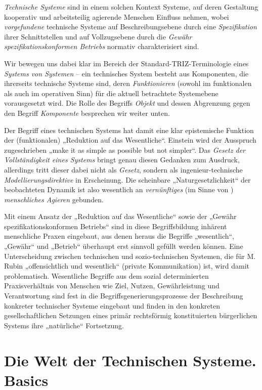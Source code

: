 \documentclass[11pt,a4paper]{article}
\begin{document}
\emph{Technische Systeme} sind in einem solchen Kontext Systeme, auf deren
Gestaltung kooperativ und arbeitsteilig agierende Menschen Einfluss nehmen,
wobei \emph{vorgefundene} technische Systeme auf Beschreibungsebene durch eine
\emph{Spezifikation} ihrer Schnittstellen und auf Vollzugsebene durch die
\emph{Gewähr spezifikationskonformen Betriebs} normativ charakterisiert sind.

Wir bewegen uns dabei klar im Bereich der Standard-TRIZ-Terminologie eines
\emph{Systems von Systemen} -- ein technisches System besteht aus Komponenten,
die ihrerseits technische Systeme sind, deren \emph{Funktionieren} (sowohl im
funktionalen als auch im operativen Sinn) für die aktuell betrachtete
Systemebene vorausgesetzt wird. Die Rolle des Begriffs \emph{Objekt} und
dessen Abgrenzung gegen den Begriff \emph{Komponente} besprechen wir weiter
unten. 

Der Begriff eines technischen Systems hat damit eine klar epistemische
Funktion der (funktionalen) „Reduktion auf das Wesentliche“.  Einstein wird
der Ausspruch zugeschrieben „make it as simple as possible but not
simpler“. Das \emph{Gesetz der Vollständigkeit eines Systems} bringt genau
diesen Gedanken zum Ausdruck, allerdings tritt dieser dabei nicht als
\emph{Gesetz}, sondern als ingenieur-technische \emph{Modellierungsdirektive}
in Erscheinung.  Die scheinbare „Naturgesetzlichkeit“ der beobachteten Dynamik
ist also wesentlich an \emph{vernünftiges} (im Sinne von \cite{Vernadsky1997})
\emph{menschliches Agieren} gebunden.

Mit einem Ansatz der „Reduktion auf das Wesentliche“ sowie der „Gewähr
spezifikationskonformen Betriebs“ sind in diese Begriffsbildung inhärent
menschliche Praxen eingebaut, aus denen heraus die Begriffe „wesentlich“,
„Gewähr“ und „Betrieb“ überhaupt erst sinnvoll gefüllt werden können.  Eine
Unterscheidung zwischen technischen und sozio-technischen Systemen, die für
M. Rubin „offensichtlich und wesentlich“ (private Kommunikation) ist, wird
damit problematisch. Wesentliche Begriffe aus dem sozial determinierten
Praxisverhältnis von Menschen wie Ziel, Nutzen, Gewährleistung und
Verantwortung sind fest in die Begriffsgenerierungsprozesse der Beschreibung
konkreter technischer Systeme eingebaut und finden in den konkreten
gesellschaftlichen Setzungen eines primär rechtsförmig konstituierten
bürgerlichen Systems ihre „natürliche“ Fortsetzung.

\section{Die Welt der Technischen Systeme. Basics}
\end{document}
